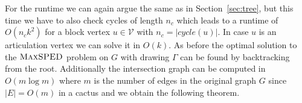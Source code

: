 \documentclass[a4paper,english,numberwithinsect]{eurocg18}
\newcommand{\maxsped}{\ensuremath{\textsc{MaxSPED}}\xspace}
\newcommand{\sollong}{\ensuremath{\textit{long}}\xspace}
\newcommand{\solmid}{\ensuremath{\textit{mid}}\xspace}
\newcommand{\solshort}{\ensuremath{\textit{short}}\xspace}
\begin{document}
For the runtime we can again argue the same as in Section~\ref{sec:tree}, but this time we have to also check cycles of length $ n_c $ which leads to a runtime of $ O(n_ck^2) $ for a block vertex $ u \in \mathcal V $ with $ n_c = |\textit{cycle}(u)| $. In case $ u $ is an articulation vertex we can solve it in $ O(k) $. As before the optimal solution to the \maxsped problem on $ G $ with drawing $ \Gamma $ can be found by backtracking from the root. Additionally the intersection graph can be computed in $ O(m\log m) $ where $ m $ is the number of edges in the original graph $ G $ since $ |E| = O(m) $ in a cactus and we obtain the following theorem.
%
\end{document}
